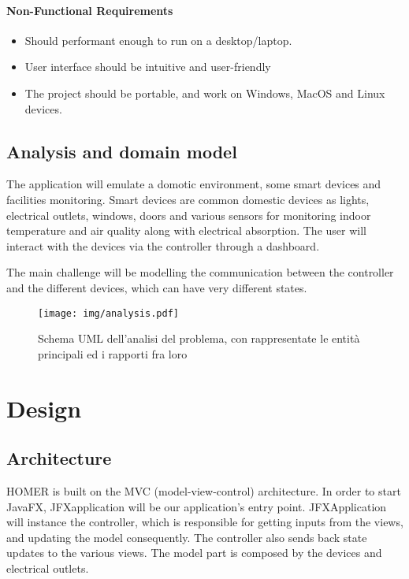 \documentclass[a4paper,12pt]{report}
\begin{document}
\subsubsection{Non-Functional Requirements}

\begin{itemize}
	\item Should performant enough to run on a desktop/laptop.
	\item User interface should be intuitive and user-friendly
	\item The project should be portable, and work on Windows, MacOS and Linux devices.
\end{itemize}

\section{Analysis and domain model}

The application will emulate a domotic environment, some smart devices and facilities monitoring.
Smart devices are common domestic devices as lights, electrical outlets, windows, doors and various sensors 
for monitoring indoor temperature and air quality along with electrical absorption.
The user will interact with the devices via the controller through a dashboard.

The main challenge will be modelling the communication between the controller 
and the different devices, which can have very different states.

\begin{figure}[H]
\centering{}
\texttt{[image: img/analysis.pdf]}
\caption{Schema UML dell'analisi del problema, con rappresentate le entità principali ed i rapporti fra loro}
\label{img:analysis}
\end{figure}

\chapter{Design}
\section{Architecture}

HOMER is built on the MVC (model-view-control) architecture. 
In order to start JavaFX, JFXapplication will be our application's entry point.
JFXApplication will instance the controller, which is responsible for getting inputs from the views,
and updating the model consequently. The controller also sends back state updates to the various views.
The model part is composed by the devices and electrical outlets.
\end{document}
